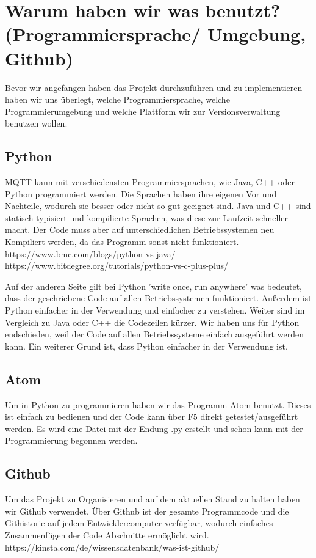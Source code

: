 \section{Warum haben wir was benutzt? (Programmiersprache/ Umgebung, Github)}
Bevor wir angefangen haben das Projekt durchzuführen und zu implementieren haben wir uns überlegt, welche Programmiersprache, welche Programmierumgebung und welche Plattform wir zur Versionsverwaltung benutzen wollen.

\subsection{Python}
MQTT kann mit verschiedensten Programmiersprachen, wie Java, C++ oder Python programmiert werden.
Die Sprachen haben ihre eigenen Vor und Nachteile, wodurch sie besser oder nicht so gut geeignet sind.
Java und C++ sind statisch typisiert und kompilierte Sprachen, was diese zur Laufzeit schneller macht. Der Code muss aber auf unterschiedlichen Betriebssystemen neu Kompiliert werden, da das Programm sonst nicht funktioniert. https://www.bmc.com/blogs/python-vs-java/
https://www.bitdegree.org/tutorials/python-vs-c-plus-plus/

Auf der anderen Seite gilt bei Python 'write once, run anywhere' was bedeutet, dass der geschriebene Code auf allen Betriebssystemen funktioniert. 
Außerdem ist Python einfacher in der Verwendung und einfacher zu verstehen. Weiter sind im Vergleich zu Java oder C++ die Codezeilen kürzer.
Wir haben uns für Python endschieden, weil der Code auf allen Betriebssysteme einfach ausgeführt werden kann. Ein weiterer Grund ist, dass Python einfacher in der Verwendung ist.


\subsection{Atom}
Um in Python zu programmieren haben wir das Programm Atom benutzt. Dieses ist einfach zu bedienen und der Code kann über F5 direkt getestet/ausgeführt werden.
Es wird eine Datei mit der Endung .py erstellt und schon kann mit der Programmierung begonnen werden.

\subsection{Github}
Um das Projekt zu Organisieren und auf dem aktuellen Stand zu halten haben wir Github verwendet.
Über Github ist der gesamte Programmcode und die Githistorie auf jedem Entwicklercomputer verfügbar, wodurch einfaches Zusammenfügen der Code Abschnitte  ermöglicht wird.
https://kinsta.com/de/wissensdatenbank/was-ist-github/